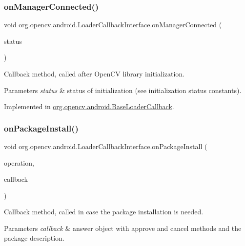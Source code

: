 \subsubsection{\texorpdfstring{on\+Manager\+Connected()}{onManagerConnected()}}
{\footnotesize\ttfamily void org.\+opencv.\+android.\+Loader\+Callback\+Interface.\+on\+Manager\+Connected (\begin{DoxyParamCaption}\item[{int}]{status }\end{DoxyParamCaption})}

Callback method, called after Open\+CV library initialization. 
\begin{DoxyParams}{Parameters}
{\em status} & status of initialization (see initialization status constants). \\
\hline
\end{DoxyParams}


Implemented in \mbox{\hyperlink{classorg_1_1opencv_1_1android_1_1_base_loader_callback_a9d397061f3f7713e91c06685462bc12d}{org.\+opencv.\+android.\+Base\+Loader\+Callback}}.

\mbox{\label{interfaceorg_1_1opencv_1_1android_1_1_loader_callback_interface_a996cd7844145b1e99ceeda27af9a6713}} 
\subsubsection{\texorpdfstring{on\+Package\+Install()}{onPackageInstall()}}
{\footnotesize\ttfamily void org.\+opencv.\+android.\+Loader\+Callback\+Interface.\+on\+Package\+Install (\begin{DoxyParamCaption}\item[{final int}]{operation,  }\item[{\mbox{\hyperlink{interfaceorg_1_1opencv_1_1android_1_1_install_callback_interface}{Install\+Callback\+Interface}}}]{callback }\end{DoxyParamCaption})}

Callback method, called in case the package installation is needed. 
\begin{DoxyParams}{Parameters}
{\em callback} & answer object with approve and cancel methods and the package description. \\
\hline
\end{DoxyParams}


